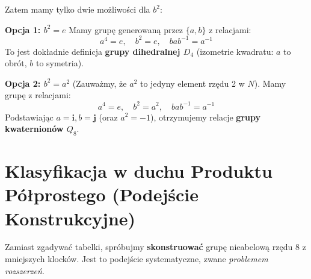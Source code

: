 \begin{enumerate}[label=\Roman*)]
    Zatem mamy tylko dwie możliwości dla $b^2$:
    
    \textbf{Opcja 1: $b^2 = e$}
    Mamy grupę generowaną przez $\{a, b\}$ z relacjami:
    \[ a^4 = e, \quad b^2 = e, \quad bab^{-1} = a^{-1} \]
    To jest dokładnie definicja \textbf{grupy dihedralnej $D_4$} (izometrie kwadratu: $a$ to obrót, $b$ to symetria).
    
    \textbf{Opcja 2: $b^2 = a^2$} (Zauważmy, że $a^2$ to jedyny element rzędu 2 w $N$).
    Mamy grupę z relacjami:
    \[ a^4 = e, \quad b^2 = a^2, \quad bab^{-1} = a^{-1} \]
    Podstawiając $a = \mathbf{i}, b = \mathbf{j}$ (oraz $a^2 = -1$), otrzymujemy relacje \textbf{grupy kwaternionów $Q_8$}.
\end{enumerate}

\section{Klasyfikacja w duchu Produktu Półprostego (Podejście Konstrukcyjne)}

Zamiast zgadywać tabelki, spróbujmy \textbf{skonstruować} grupę nieabelową rzędu 8 z mniejszych klocków. Jest to podejście systematyczne, zwane \textit{problemem rozszerzeń}.

